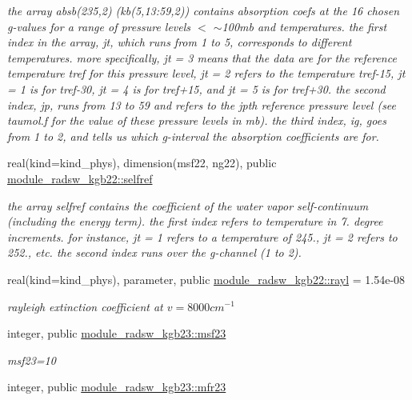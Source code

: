 \begin{Indent}
\begin{DoxyCompactItemize}
\begin{DoxyCompactList}\small\item\em the array absb(235,2) (kb(5,13\+:59,2)) contains absorption coefs at the 16 chosen g-\/values for a range of pressure levels $<$ $\sim$100mb and temperatures. the first index in the array, jt, which runs from 1 to 5, corresponds to different temperatures. more specifically, jt = 3 means that the data are for the reference temperature tref for this pressure level, jt = 2 refers to the temperature tref-\/15, jt = 1 is for tref-\/30, jt = 4 is for tref+15, and jt = 5 is for tref+30. the second index, jp, runs from 13 to 59 and refers to the jpth reference pressure level (see taumol.\+f for the value of these pressure levels in mb). the third index, ig, goes from 1 to 2, and tells us which g-\/interval the absorption coefficients are for. \end{DoxyCompactList}\item 
real(kind=kind\+\_\+phys), dimension(msf22, ng22), public \hyperlink{group__module__radsw__kgbnn_gabc3bd99e8ad7d1f09fb7fab7ed67a32b}{module\+\_\+radsw\+\_\+kgb22\+::selfref}
\begin{DoxyCompactList}\small\item\em the array selfref contains the coefficient of the water vapor self-\/continuum (including the energy term). the first index refers to temperature in 7. degree increments. for instance, jt = 1 refers to a temperature of 245., jt = 2 refers to 252., etc. the second index runs over the g-\/channel (1 to 2). \end{DoxyCompactList}\item 
real(kind=kind\+\_\+phys), parameter, public \hyperlink{group__module__radsw__kgbnn_gae77b766677ea476e2ba14b88e511870a}{module\+\_\+radsw\+\_\+kgb22\+::rayl} = 1.\+54e-\/08
\begin{DoxyCompactList}\small\item\em rayleigh extinction coefficient at $v=8000cm^{-1}$ \end{DoxyCompactList}\item 
integer, public \hyperlink{group__module__radsw__kgbnn_gab96959c26232963a568609451483843e}{module\+\_\+radsw\+\_\+kgb23\+::msf23}
\begin{DoxyCompactList}\small\item\em msf23=10 \end{DoxyCompactList}\item 
integer, public \hyperlink{group__module__radsw__kgbnn_ga78b43ec4bc2afd4f520480a8410d9df5}{module\+\_\+radsw\+\_\+kgb23\+::mfr23}

\end{DoxyCompactItemize}
\end{Indent}
